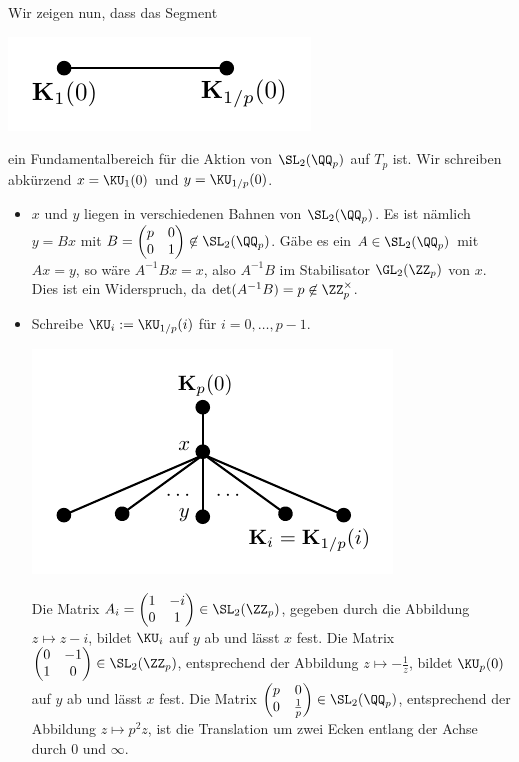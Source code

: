 Wir zeigen nun, dass das Segment
\begin{center}
	\includegraphics{grugraImages/Kkante}
\end{center}
ein Fundamentalbereich für die Aktion von $\SL_2(\QQ_p)$ auf $T_p$
ist. Wir schreiben abkürzend $x=\KU_1(0)$ und $y=\KU_{1/p}(0)$.
\begin{itemize}
\item $x$ und $y$ liegen in verschiedenen Bahnen von $\SL_2(\QQ_p)$.
Es ist nämlich $y=Bx$ mit
$B=\begin{pmatrix} p&0\\ 0&1 \end{pmatrix}\not\in\SL_2(\QQ_p)$.
Gäbe es ein $A\in\SL_2(\QQ_p)$ mit $Ax=y$, so wäre
$A^{-1} B x = x$, also $A^{-1}B$ im Stabilisator $\GL_2(\ZZ_p)$
von $x$. Dies ist ein Widerspruch, da
$\det(A^{-1}B)=p\not\in\ZZ_p^\times$.
\item Schreibe $\KU_i:=\KU_{1/p}(i)$ für $i=0,\ldots,p-1$.
\begin{center}
	\includegraphics{grugraImages/Ki}
\end{center}
Die Matrix
$A_i=\begin{pmatrix} 1&-i\\ 0&1\end{pmatrix}\in\SL_2(\ZZ_p)$,
gegeben durch die Abbildung
$z\mapsto z-i$, bildet $\KU_i$ auf $y$ ab und lässt $x$ fest.
Die Matrix
$\begin{pmatrix} 0&-1\\ 1&0 \end{pmatrix}\in\SL_2(\ZZ_p)$,
entsprechend der Abbildung $z\mapsto -\frac{1}{z}$, bildet
$\KU_p(0)$ auf $y$ ab und lässt $x$ fest.
Die Matrix
$\begin{pmatrix} p&0\\ 0&\frac{1}{p} \end{pmatrix}\in\SL_2(\QQ_p)$,
entsprechend der Abbildung $z\mapsto p^2z$, ist die Translation
um zwei Ecken entlang der Achse durch $0$ und $\infty$.
\end{itemize}
